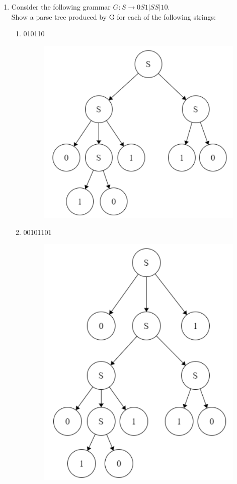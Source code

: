 \documentclass{article}
\begin{document}
\begin{enumerate}
\begin{enumerate}[label=(\alph*)]
		\end{enumerate}
		\item  Consider the following grammar $G : S \rightarrow 0S1|SS|10$.\\
		Show a parse tree produced by G for each of the following strings:
		\begin{enumerate}[label=(\alph*)]
			\item 010110	
			\begin{figure}[H]
				\centering
				\includegraphics[width=0.7\linewidth]{8a}
				\caption{}
				\label{fig:8a}
			\end{figure}
			\item 00101101
			\begin{figure}[H]
				\centering
				\includegraphics[width=0.7\linewidth]{8b}
				\caption{}
				\label{fig:8b}
			\end{figure}
		\end{enumerate}
	\end{enumerate}
\end{document}
